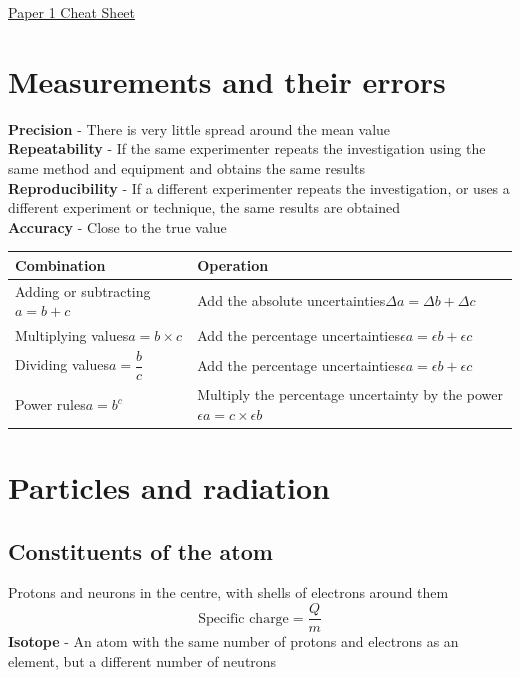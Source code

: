 \documentclass[12pt]{article}
\begin{document}
\begin{center}
\underline{\huge Paper 1 Cheat Sheet}
\end{center}
\section{Measurements and their errors}
\textbf{Precision} - There is very little spread around the mean value\\
\textbf{Repeatability} - If the same experimenter repeats the investigation using the same method and equipment and obtains the same results\\
\textbf{Reproducibility} - If a different experimenter repeats the investigation, or uses a different experiment or technique, the same results are obtained\\
\textbf{Accuracy} - Close to the true value\\
{\renewcommand{\arraystretch}{2}
\begin{tabularx}{\textwidth}{|X|X|}
\hline
Combination&Operation\\
\hline
Adding or subtracting\newline $a=b+c$&Add the absolute uncertainties\newline $\Delta a=\Delta b+\Delta c$\\
\hline
Multiplying values\newline $a=b\times c$&Add the percentage uncertainties\newline $\epsilon a=\epsilon b+\epsilon c$\\
\hline
Dividing values\newline $a=\dfrac{b}{c}$&Add the percentage uncertainties\newline $\epsilon a=\epsilon b+\epsilon c$\\
\hline
Power rules\newline $a=b^c$&Multiply the percentage uncertainty by the power\newline $\epsilon a=c\times\epsilon b$\\
\hline
\end{tabularx}}
\newpage
\section{Particles and radiation}
\subsection{Constituents of the atom}
Protons and neurons in the centre, with shells of electrons around them
$$\textrm{Specific charge}=\frac{Q}{m}$$
\textbf{Isotope} - An atom with the same number of protons and electrons as an element, but a different number of neutrons
\end{document}
